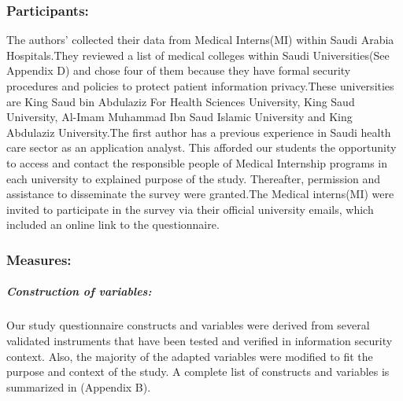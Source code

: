 \subsubsection{Participants:}
The authors’ collected their data from Medical Interns(MI) within Saudi Arabia Hospitals.They reviewed a list of medical colleges within Saudi Universities(See Appendix D) and chose four of them because they have formal security procedures and policies to protect patient information privacy.These universities are King Saud bin Abdulaziz For Health Sciences University, King Saud University, Al-Imam Muhammad Ibn Saud Islamic University and King Abdulaziz University.The first author has a previous experience in Saudi health care sector as an application analyst. This afforded our students the opportunity to access and contact the responsible people of Medical Internship programs in each university to explained purpose of the study. Thereafter, permission and assistance to disseminate the survey were granted.The Medical interns(MI) were invited to participate in the survey via their official university emails, which included an online link to the questionnaire. 
\subsubsection{Measures:}
\subparagraph{Construction of variables:} Our study questionnaire constructs and variables were derived from several validated instruments that have been tested and verified in information security context. Also, the majority of the adapted variables were modified to fit the purpose and context of the study. A complete list of constructs and variables is summarized in (Appendix B).

